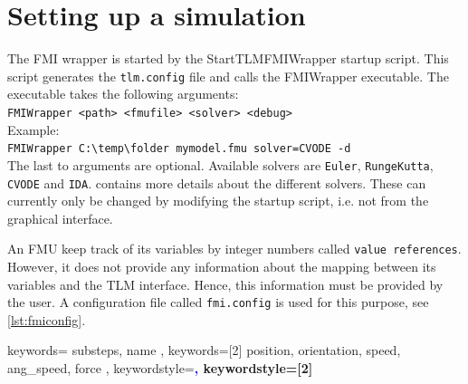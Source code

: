 \documentclass[a4paper,12pt]{include/opencpsreport}
\begin{document}
\clearpage
\section{Setting up a simulation}
\label{sec:setting_up}
The FMI wrapper is started by the StartTLMFMIWrapper startup script.
This script generates the \texttt{tlm.config} file and calls the FMIWrapper executable.
The executable takes the following arguments:\\

\noindent \verb|FMIWrapper <path> <fmufile> <solver> <debug>|\\

Example:\\

\noindent \verb|FMIWrapper C:\temp\folder mymodel.fmu solver=CVODE -d|\\

The last to arguments are optional.
Available solvers are \texttt{Euler}, \texttt{RungeKutta}, \texttt{CVODE} and \texttt{IDA}.
 contains more details about the different solvers.
These can currently only be changed by modifying the startup script, i.e. not from the graphical interface.

An FMU keep track of its variables by integer numbers called \texttt{value references}.
However, it does not provide any information about the mapping between its variables and the TLM interface.
Hence, this information must be provided by the user.
A configuration file called \texttt{fmi.config} is used for this purpose, see \cref{lst:fmiconfig}.

{
  keywords={
    substeps,
    name
  },
  keywords=[2]{
    position,
    orientation,
    speed,
    ang_speed,
    force
  },
  keywordstyle=\ttfamily\bfseries\textcolor{blue},
  keywordstyle=[2]\ttfamily\bfseries
}
\end{document}
